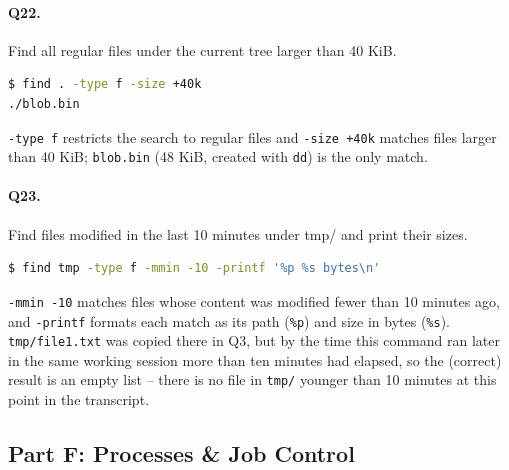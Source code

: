 \paragraph{Q22.} Find all regular files under the current tree larger than 40 KiB.
\begin{lstlisting}[language=bash,caption={Q22 evidence: \texttt{find . -type f -size +40k}},label={Listing:Q22}]
$ find . -type f -size +40k
./blob.bin
\end{lstlisting}
\texttt{-type f} restricts the search to regular files and \texttt{-size +40k} matches files larger than 40 KiB; \texttt{blob.bin} (48 KiB, created with \texttt{dd}) is the only match.

\paragraph{Q23.} Find files modified in the last 10 minutes under tmp/ and print their sizes.
\begin{lstlisting}[language=bash,caption={Q23 evidence: \texttt{find tmp -type f -mmin -10 -printf '\%p \%s bytes\textbackslash{}n'}},label={Listing:Q23}]
$ find tmp -type f -mmin -10 -printf '%p %s bytes\n'
\end{lstlisting}
\texttt{-mmin -10} matches files whose content was modified fewer than 10 minutes ago, and \texttt{-printf} formats each match as its path (\texttt{\%p}) and size in bytes (\texttt{\%s}). \texttt{tmp/file1.txt} was copied there in Q3, but by the time this command ran later in the same working session more than ten minutes had elapsed, so the (correct) result is an empty list -- there is no file in \texttt{tmp/} younger than 10 minutes at this point in the transcript.

\subsection{Part F: Processes \& Job Control}
